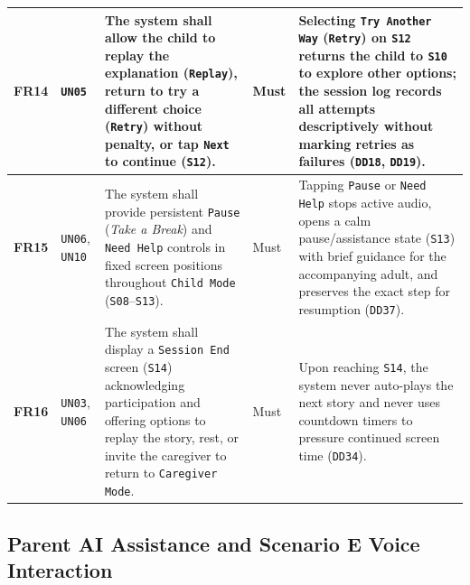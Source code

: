 \begin{footnotesize}
\begin{xltabular}{\textwidth}{|c|p{2.2cm}|X|p{2.0cm}|p{2.4cm}|}
\textbf{FR14} & \texttt{UN05} & The system shall allow the child to replay the explanation (\texttt{Replay}), return to try a different choice (\texttt{Retry}) without penalty, or tap \texttt{Next} to continue (\texttt{S12}). & Must & Selecting \texttt{Try Another Way} (\texttt{Retry}) on \texttt{S12} returns the child to \texttt{S10} to explore other options; the session log records all attempts descriptively without marking retries as failures (\texttt{DD18}, \texttt{DD19}). \\ \hline
\textbf{FR15} & \texttt{UN06}, \texttt{UN10} & The system shall provide persistent \texttt{Pause} (\textit{Take a Break}) and \texttt{Need Help} controls in fixed screen positions throughout \texttt{Child Mode} (\texttt{S08}–\texttt{S13}). & Must & Tapping \texttt{Pause} or \texttt{Need Help} stops active audio, opens a calm pause/assistance state (\texttt{S13}) with brief guidance for the accompanying adult, and preserves the exact step for resumption (\texttt{DD37}). \\ \hline
\textbf{FR16} & \texttt{UN03}, \texttt{UN06} & The system shall display a \texttt{Session End} screen (\texttt{S14}) acknowledging participation and offering options to replay the story, rest, or invite the caregiver to return to \texttt{Caregiver Mode}. & Must & Upon reaching \texttt{S14}, the system never auto-plays the next story and never uses countdown timers to pressure continued screen time (\texttt{DD34}). \\ \hline
\end{xltabular}
\end{footnotesize}



\subsection{Parent AI Assistance and Scenario E Voice Interaction}


